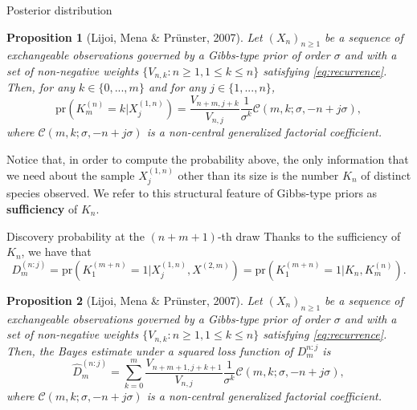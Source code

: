 \documentclass[11pt, handout]{beamer}
\newtheorem{proposition}{Proposition}
\begin{document}
\begin{frame}{Posterior distribution}
    \begin{proposition}[Lijoi, Mena \& Pr{\"u}nster, 2007]
        Let \((X_n)_{n \geq 1}\) be a sequence of exchangeable observations governed by a Gibbs-type prior of order \(\sigma\) and with a set of non-negative weights \(\{V_{n, k} \colon n \geq 1, 1 \leq k \leq n\}\) satisfying \eqref{eq:recurrence}. Then, for any \(k \in \{0,...,m\}\) and for any \(j \in \{1,...,n\}\),
        \begin{equation*}
            \text{pr}(K_m^{(n)} = k | X_j^{(1,n)}) = \frac{V_{n+m,j+k}}{V_{n,j}}\frac{1}{\sigma^k} \mathscr{C}(m, k; \sigma, -n + j \sigma),
        \end{equation*}
        where \(\mathscr{C}(m, k; \sigma, -n + j \sigma)\) is a non-central generalized factorial coefficient.
    \end{proposition}
    \medskip
    Notice that, in order to compute the probability above, the only information that we need about the sample \(X_j^{(1,n)}\) other than its size is the number \(K_n\) of distinct species observed. We refer to this structural feature of Gibbs-type priors as \textbf{sufficiency} of \(K_n\).
\end{frame}

\begin{frame}{Discovery probability at the \((n+m+1)\)-th draw}
    Thanks to the sufficiency of \(K_n\), we have that
    \begin{equation*}
        D_m^{(n:j)} = \text{pr}(K_1^{(m + n)} = 1 | X_j^{(1,n)}, X^{(2, m)}) = \text{pr}(K_1^{(m + n)} = 1 | K_n, K^{(n)}_m).
    \end{equation*}
    \begin{proposition}[Lijoi, Mena \& Pr{\"u}nster, 2007]
        Let \((X_n)_{n \geq 1}\) be a sequence of exchangeable observations governed by a Gibbs-type prior of order \(\sigma\) and with a set of non-negative weights \(\{V_{n, k} \colon n \geq 1, 1 \leq k \leq n\}\) satisfying \eqref{eq:recurrence}. Then, the Bayes estimate under a squared loss function of \(D_m^{n:j}\) is 
        \begin{equation*}
            \hat{D}_m^{(n:j)} = \sum_{k = 0}^m \frac{V_{n+m+1,j+k+1}}{V_{n,j}}\frac{1}{\sigma^k}\mathscr{C}(m, k; \sigma, -n + j\sigma),
        \end{equation*}
        where \(\mathscr{C}(m, k; \sigma, -n + j \sigma)\) is a non-central generalized factorial coefficient.
    \end{proposition}
\end{frame}
\end{document}
